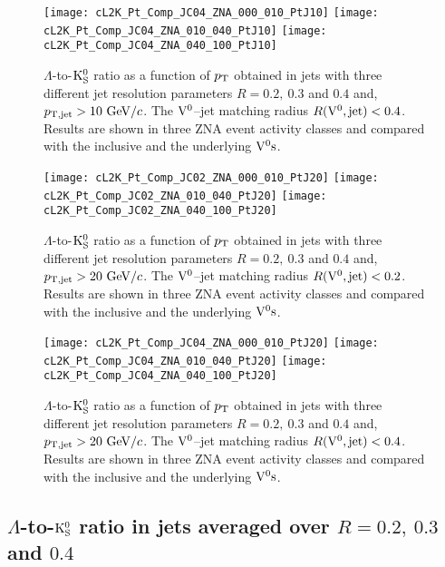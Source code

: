 \documentclass[12pt]{article}
\begin{document}
\begin{figure}[htbp]
\centering
\texttt{[image: cL2K\_Pt\_Comp\_JC04\_ZNA\_000\_010\_PtJ10]}
\texttt{[image: cL2K\_Pt\_Comp\_JC04\_ZNA\_010\_040\_PtJ10]}
\texttt{[image: cL2K\_Pt\_Comp\_JC04\_ZNA\_040\_100\_PtJ10]}
\caption{$\Lambda$-to-${\rm K}_{\rm S}^{0}$ ratio as a function of $p_{\rm T}$
  obtained in jets with three different jet resolution
  parameters $R=0.2,~0.3$ and $0.4$ and, $p_{\rm T,jet}>10~{\rm GeV}/c$.
  The ${\rm V}^{0}$--jet matching radius $R({\rm V}^{0},{\rm jet})<0.4$.
  Results are shown in three ZNA event activity classes and
  compared with the inclusive and the underlying ${\rm V}^{0}{\rm s}$.}
\label{fig:s01L2KJC04ZNAPtj10}
\end{figure}

\begin{figure}[htbp]
\centering
\texttt{[image: cL2K\_Pt\_Comp\_JC02\_ZNA\_000\_010\_PtJ20]}
\texttt{[image: cL2K\_Pt\_Comp\_JC02\_ZNA\_010\_040\_PtJ20]}
\texttt{[image: cL2K\_Pt\_Comp\_JC02\_ZNA\_040\_100\_PtJ20]}
\caption{$\Lambda$-to-${\rm K}_{\rm S}^{0}$ ratio as a function of $p_{\rm T}$
  obtained in jets with three different jet resolution
  parameters $R=0.2,~0.3$ and $0.4$ and, $p_{\rm T,jet}>20~{\rm GeV}/c$.
  The ${\rm V}^{0}$--jet matching radius $R({\rm V}^{0},{\rm jet})<0.2$.
  Results are shown in three ZNA event activity classes and
  compared with the inclusive and the underlying ${\rm V}^{0}{\rm s}$.}
\label{fig:s01L2KJC02ZNAPtj20}
\end{figure}

\begin{figure}[htbp]
\centering
\texttt{[image: cL2K\_Pt\_Comp\_JC04\_ZNA\_000\_010\_PtJ20]}
\texttt{[image: cL2K\_Pt\_Comp\_JC04\_ZNA\_010\_040\_PtJ20]}
\texttt{[image: cL2K\_Pt\_Comp\_JC04\_ZNA\_040\_100\_PtJ20]}
\caption{$\Lambda$-to-${\rm K}_{\rm S}^{0}$ ratio as a function of $p_{\rm T}$
  obtained in jets with three different jet resolution
  parameters $R=0.2,~0.3$ and $0.4$ and, $p_{\rm T,jet}>20~{\rm GeV}/c$.
  The ${\rm V}^{0}$--jet matching radius $R({\rm V}^{0},{\rm jet})<0.4$.
  Results are shown in three ZNA event activity classes and
  compared with the inclusive and the underlying ${\rm V}^{0}{\rm s}$.}
\label{fig:s01L2KJC04ZNAPtj20}
\end{figure}

\newpage
\subsection{$\Lambda$-to-${\rm K}_{\rm S}^{0}$ ratio in jets averaged over $R=0.2,~0.3$ and $0.4$}
\end{document}
